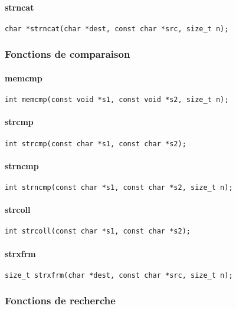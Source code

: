 \paragraph{strncat}
\begin{Verbatim}
char *strncat(char *dest, const char *src, size_t n);
\end{Verbatim}

\subsubsection{Fonctions de comparaison}

\paragraph{memcmp}
\begin{Verbatim}
int memcmp(const void *s1, const void *s2, size_t n);
\end{Verbatim}
\paragraph{strcmp}
\begin{Verbatim}
int strcmp(const char *s1, const char *s2);
\end{Verbatim}
\paragraph{strncmp}
\begin{Verbatim}
int strncmp(const char *s1, const char *s2, size_t n);
\end{Verbatim}
\paragraph{strcoll}
\begin{Verbatim}
int strcoll(const char *s1, const char *s2);
\end{Verbatim}
\paragraph{strxfrm}
\begin{Verbatim}
size_t strxfrm(char *dest, const char *src, size_t n);
\end{Verbatim}

\subsubsection{Fonctions de recherche}

